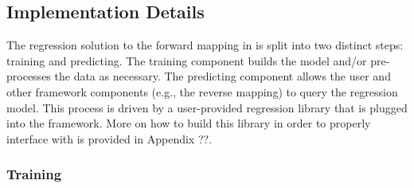 
\subsection{Implementation Details}

The \fw regression solution to the forward mapping in \fw is split into two distinct steps: training and predicting.
The training component builds the model and/or pre-processes the data as necessary.
The predicting component allows the user and other framework components (e.g., the reverse mapping) to query the regression model.
This process is driven by a user-provided regression library that is plugged into the framework.
More on how to build this library in order to properly interface with \fw is provided in Appendix ??.

\subsubsection{Training}

